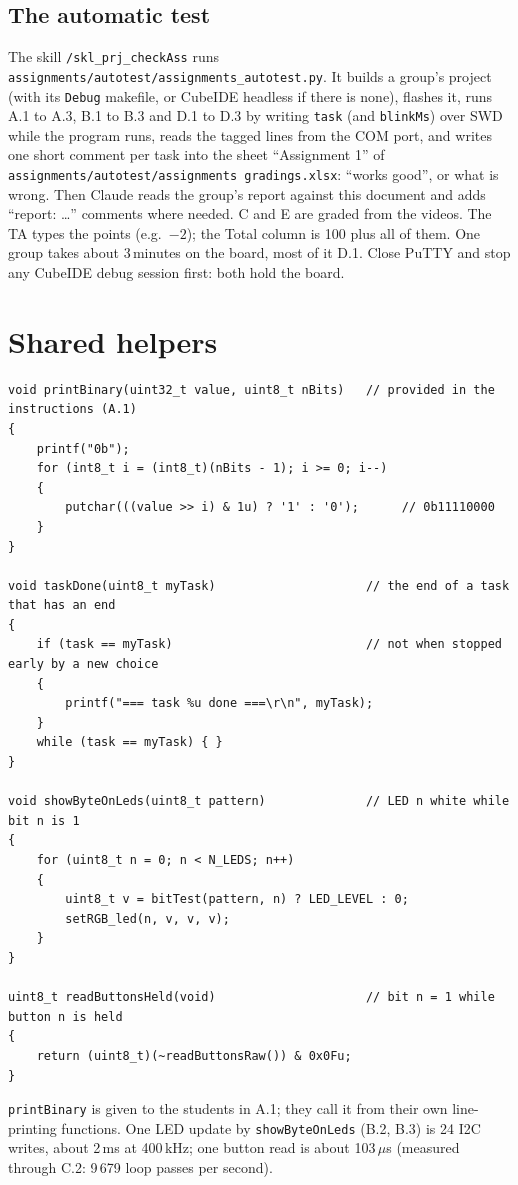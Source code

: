 \documentclass[11pt,a4paper]{article}
\newcommand{\lv}[1]{\texttt{#1}}                 %
\begin{document}
\subsection{The automatic test}
The skill \texttt{/skl\_prj\_checkAss} runs \texttt{assignments/autotest/assignments\_autotest.py}. It builds a
group's project (with its \texttt{Debug} makefile, or CubeIDE headless if there is none), flashes it, runs A.1 to A.3,
B.1 to B.3 and D.1 to D.3 by writing \lv{task} (and \lv{blinkMs}) over SWD while the program runs, reads the tagged
lines from the COM port, and writes one short comment per task into the sheet ``Assignment 1'' of
\texttt{assignments/autotest/assignments gradings.xlsx}: ``works good'', or what is wrong. Then Claude reads the
group's report against this document and adds ``report: \ldots'' comments where needed. C and E are graded from the
videos. The TA types the points (e.g.\ $-2$); the Total column is 100 plus all of them. One group takes about
3\,minutes on the board, most of it D.1. Close PuTTY and stop any CubeIDE debug session first: both hold the board.

\section{Shared helpers}
\begin{lstlisting}
void printBinary(uint32_t value, uint8_t nBits)   // provided in the instructions (A.1)
{
    printf("0b");
    for (int8_t i = (int8_t)(nBits - 1); i >= 0; i--)
    {
        putchar(((value >> i) & 1u) ? '1' : '0');      // 0b11110000
    }
}

void taskDone(uint8_t myTask)                     // the end of a task that has an end
{
    if (task == myTask)                           // not when stopped early by a new choice
    {
        printf("=== task %u done ===\r\n", myTask);
    }
    while (task == myTask) { }
}

void showByteOnLeds(uint8_t pattern)              // LED n white while bit n is 1
{
    for (uint8_t n = 0; n < N_LEDS; n++)
    {
        uint8_t v = bitTest(pattern, n) ? LED_LEVEL : 0;
        setRGB_led(n, v, v, v);
    }
}

uint8_t readButtonsHeld(void)                     // bit n = 1 while button n is held
{
    return (uint8_t)(~readButtonsRaw()) & 0x0Fu;
}
\end{lstlisting}
\texttt{printBinary} is given to the students in A.1; they call it from their own line-printing
functions. One LED update by \texttt{showByteOnLeds} (B.2, B.3) is 24 I2C writes, about 2\,ms at 400\,kHz; one button read is about
103\,$\mu$s (measured through C.2: 9\,679 loop passes per second).
\end{document}
